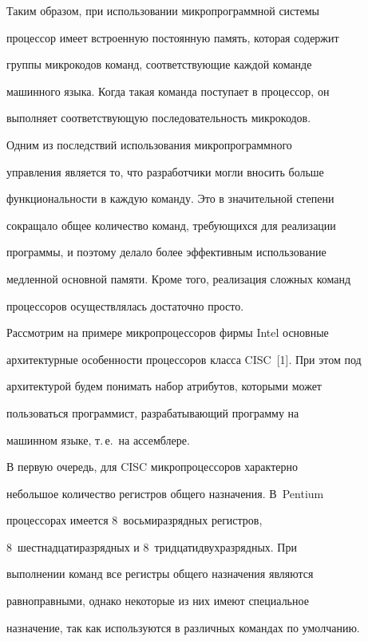 Таким образом, при использовании микропрограммной системы  


процессор имеет встроенную постоянную память, которая содержит 


группы микрокодов команд,  соответствующие каждой команде 


машинного языка. Когда такая команда поступает в процессор, он 


выполняет соответствующую последовательность мик\-ро\-кодов.  


 


 Одним из последствий использования микропрограммного 


управ\-ле\-ния является то, что разработчики могли вносить больше 


функциональности в каждую команду. Это в значительной степени 


сокращало общее количество команд, требующихся для реализации 


программы, и поэтому делало более эффективным использование 


медленной основной памяти. Кроме того, реализация сложных команд 


процессоров осуществлялась достаточно просто. 


   


Рассмотрим на примере микропроцессоров фирмы Intel основные 


архитектурные особенности процессоров класса CISC~[1]. При этом под 


архитектурой будем понимать набор атрибутов, которыми может 


пользоваться  программист,  разрабатывающий программу на 


машинном языке,  т.\,е.\ на ассемблере.   


  


  В первую очередь, для CISC микропроцессоров характерно 


небольшое количество регистров общего назначения. В~Pentium 


процессорах имеется 8~восьмиразрядных регистров, 


8~шестнадцатиразрядных и 8~тридцатидвухразрядных. При 


выполнении команд все регистры общего назначения являются 


равноправными, однако некоторые из них имеют специальное 


назначение, так как используются в различных командах по умолчанию.



